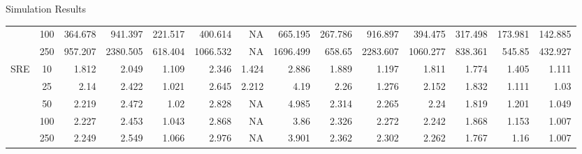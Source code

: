 \documentclass[10pt]{beamer}
\begin{document}
\begin{frame}{Simulation Results}
\begin{table}[htbp]
{\begin{tabular}{ccrrrrrrrrrrrr}
            & 100  & 364.678 & 941.397 & 221.517 & 400.614 & NA & 665.195 & 267.786 & 916.897 & 394.475 & 317.498 & 173.981 & 142.885\\ 
            & 250  & 957.207 & 2380.505 & 618.404 & 1066.532 & NA & 1696.499 & 658.65 & 2283.607 & 1060.277 & 838.361 & 545.85 & 432.927\\
            \midrule 
            \multirow{5}{*}{SRE} & 10  & 1.812 & 2.049 & 1.109 & 2.346 & 1.424 & 2.886 & 1.889 & 1.197 & 1.811 & 1.774 & 1.405 & 1.111\\ 
            & 25  & 2.14 & 2.422 & 1.021 & 2.645 & 2.212 & 4.19 & 2.26 & 1.276 & 2.152 & 1.832 & 1.111 & 1.03\\ 
            & 50  & 2.219 & 2.472 & 1.02 & 2.828 & NA & 4.985 & 2.314 & 2.265 & 2.24 & 1.819 & 1.201 & 1.049\\ 
            & 100  & 2.227 & 2.453 & 1.043 & 2.868 & NA & 3.86 & 2.326 & 2.272 & 2.242 & 1.868 & 1.153 & 1.007\\ 
            & 250  & 2.249 & 2.549 & 1.066 & 2.976 & NA & 3.901 & 2.362 & 2.302 & 2.262 & 1.767 & 1.16 & 1.007\\ 
            \bottomrule
        \end{tabular}}
    \end{table}
\end{frame}
\end{document}
